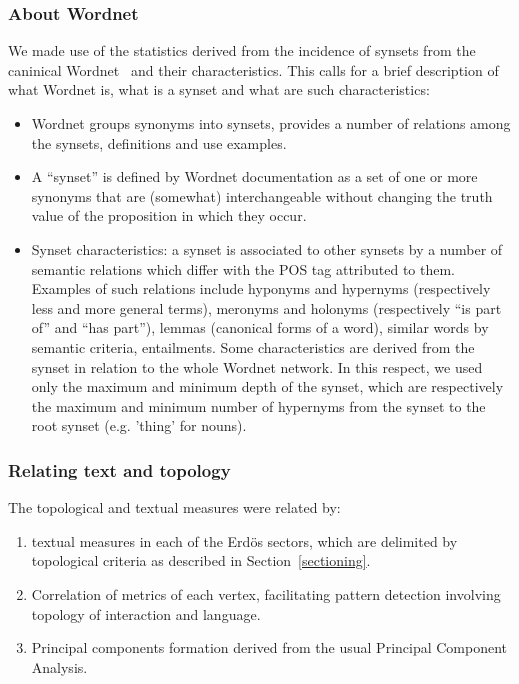 \documentclass[review]{elsarticle}
\begin{document}
\subsubsection{About Wordnet}
We made use of the statistics derived from the incidence of synsets from the caninical Wordnet~\cite{wordnet} and their characteristics.
This calls for a brief description of what Wordnet is, what is a synset and what are such characteristics:
\begin{itemize}
\item Wordnet groups synonyms into synsets, provides a number of relations among the synsets, definitions and use examples.
\item A ``synset'' is defined by Wordnet documentation as a set of one or more synonyms that are (somewhat) interchangeable without changing the truth value of the proposition in which they occur.
\item Synset characteristics: a synset is associated to other synsets by a number of semantic relations which differ with the POS tag attributed to them.
Examples of such relations include hyponyms and hypernyms (respectively less and more general terms), meronyms and holonyms (respectively ``is part of'' and ``has part''), lemmas (canonical forms of a word), similar words by semantic criteria, entailments.
Some characteristics are derived from the synset in relation to the whole Wordnet network.
In this respect, we used only the maximum and minimum depth of the synset, which are respectively the maximum and minimum number of hypernyms from the synset to the root synset (e.g. 'thing' for nouns).
\end{itemize}

\subsubsection{Relating text and topology}\label{sec:ks}
The topological and textual measures were related by:
\begin{enumerate}
\item textual measures in each of the Erdös sectors, which are delimited by topological criteria as described in Section~\ref{sectioning}.
\item Correlation of metrics of each vertex, facilitating pattern detection involving topology of interaction and language.
\item Principal components formation derived from the usual Principal Component Analysis.
\end{enumerate}
\end{document}
